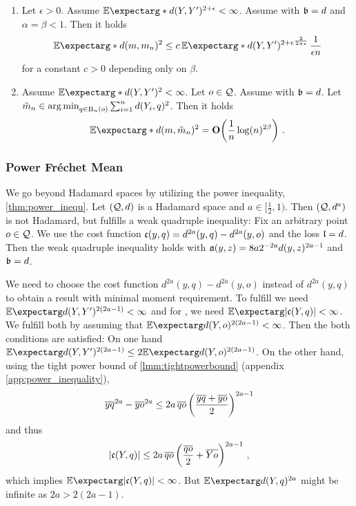 \begin{corollary}
\theoremContentInNewLine
	\begin{enumerate}[label=\environmentEnumerateLabel]
	\item 
		Let $\epsilon > 0$.
		Assume $\Ex*{d(Y,Y\pr)^{2+\epsilon}} < \infty$.
		Assume   with $\mathfrak{b} = d$ and $\alpha=\beta < 1$.
		Then it holds
		\begin{equation*}
			\Ex*{d(m, m_n)^2} \leq c\, \Ex*{d(Y,Y\pr)^{2+\epsilon}}^{\frac{2}{2+\epsilon}} \,\frac1{\epsilon n }
		\end{equation*}
		for a constant $c>0$ depending only on $\beta$.
	\item 
		Assume $\Ex*{d(Y,Y\pr)^2} < \infty$.
		Let $o\in\mathcal{Q}$. Assume  with $\mathfrak{b} = d$.
		Let $\tilde m_n \in \operatorname*{arg\,min}_{q\in\operatorname{\mathrm{B}}_n(o)} \sum_{i=1}^n d(Y_i, q)^2$.
		Then it holds
		\begin{equation*}
			\Ex*{d(m, \tilde m_n)^2} = \bigO\brOf{\frac1n \log(n)^{2\beta}}
			\eqfs
		\end{equation*}
	\end{enumerate}
\end{corollary}
%
%
\subsubsection{Power Fréchet Mean}\label{sssec:app:hadamard:pfm}
%
We go beyond Hadamard spaces by utilizing the power inequality, \autoref{thm:power_inequ}. 
Let $(\mathcal{Q}, d)$ is a Hadamard space and $a \in[\frac12,1)$. Then $(\mathcal{Q}, d^a)$ is not Hadamard, but fulfills a weak quadruple inequality: Fix an arbitrary point $o\in\mathcal{Q}$. We use the cost function $\mathfrak{c}(y,q) = d^{2a}(y,q)-d^{2a}(y,o)$ and the loss $\mathfrak{l} = d$. Then the weak quadruple inequality holds with $\mathfrak{a} (y,z) = 8a2^{-2a} d(y,z)^{2a-1}$ and $\mathfrak{b} = d$.

We need to choose the cost function $d^{2a}(y,q)-d^{2a}(y,o)$ instead of $d^{2a}(y,q)$ to obtain a result with minimal moment requirement. To fulfill  we need $\Ex{d(Y,Y\pr)^{2(2a-1)}} < \infty$ and for , we need $\Ex{\abs{\mf c(Y,q)}} < \infty$. We fulfill both by assuming that
$\Ex{d(Y,o)^{2(2a-1)}} < \infty$. Then the both conditions are satisfied: On one hand
$\Ex{d(Y,Y\pr)^{2(2a-1)}} \leq 2 \Ex{d(Y,o)^{2(2a-1)}}$. On the other hand, using 
the tight power bound of \autoref{lmm:tightpowerbound} (appendix \autoref{app:power_inequality}),
\begin{align*}
	\overline{yq}^{2a}-\overline{yo}^{2a}
	\leq 
	2 a \,\overline{qo} \left( \frac{\overline{yq} + \overline{yo}}{2} \right)^{2a-1}
\end{align*} 
and thus 
\begin{equation*}
	|\mathfrak{c}(Y,q)|  \leq 2a \,\overline{qo} \left( \frac{\overline{qo}}{2} +  \overline{Yo} \right)^{2a-1}\, ,
\end{equation*}
which implies 
$\Ex{\abs{\mf c(Y, q)}} < \infty$. But $\Ex{d(Y,q)^{2a}}$ might be infinite as $2a > 2(2a-1)$.

